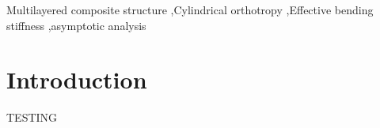 \documentclass[preprint,10pt,times]{elsarticle}
\numberwithin{equation}{section}
\renewcommand{\>}{$\Rightarrow$}
\begin{document}
\begin{frontmatter}
\begin{abstract}
\end{abstract}

\begin{keyword}
Multilayered composite structure \sep Cylindrical orthotropy \sep Effective bending stiffness \sep asymptotic analysis



\end{keyword}

\end{frontmatter}

\linenumbers

\section{Introduction}
\label{sec:intro}
TESTING

\end{document}

